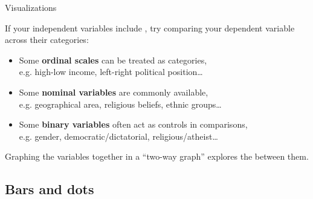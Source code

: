 \documentclass[t]{beamer}
\begin{document}
	\begin{frame}[t]{Visualizations}
	
	If your independent variables include , try comparing your dependent variable across their categories:
	
	\begin{itemize}
		\item Some \textbf{ordinal scales} can be treated as categories,\\e.g. high-low income, left-right political position…
		\item Some \textbf{nominal variables} are commonly available,\\e.g.  geographical area, religious beliefs, ethnic groups…
		\item Some \textbf{binary variables} often act as controls in comparisons,\\e.g. gender, democratic/dictatorial, religious/atheist…
	\end{itemize}
	
	Graphing the variables together in a ``two-way graph'' explores the  between them.
	\end{frame}
	
	
	\subsection{Bars and dots}
	
\end{document}
